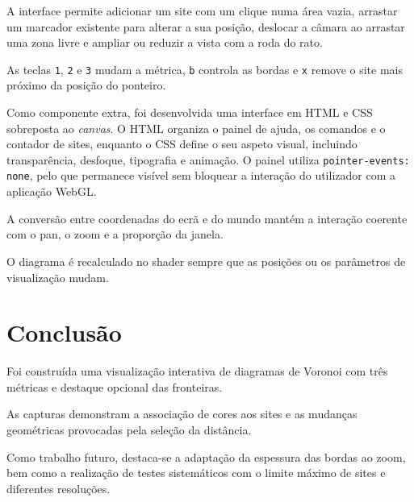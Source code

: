 \documentclass[10pt,a4paper]{article}
\begin{document}
A interface permite adicionar um site com um clique numa área vazia, arrastar um marcador existente para alterar a sua posição, deslocar a câmara ao arrastar uma zona livre e ampliar ou reduzir a vista com a roda do rato.

As teclas \texttt{1}, \texttt{2} e \texttt{3} mudam a métrica, \texttt{b} controla as bordas e \texttt{x} remove o site mais próximo da posição do ponteiro.

Como componente extra, foi desenvolvida uma interface em HTML e CSS sobreposta ao \emph{canvas}. O HTML organiza o painel de ajuda, os comandos e o contador de sites, enquanto o CSS define o seu aspeto visual, incluindo transparência, desfoque, tipografia e animação. O painel utiliza \texttt{pointer-events: none}, pelo que permanece visível sem bloquear a interação do utilizador com a aplicação WebGL.

A conversão entre coordenadas do ecrã e do mundo mantém a interação coerente com o pan, o zoom e a proporção da janela.

O diagrama é recalculado no shader sempre que as posições ou os parâmetros de visualização mudam.

\section{Conclusão}

Foi construída uma visualização interativa de diagramas de Voronoi com três métricas e destaque opcional das fronteiras.

As capturas demonstram a associação de cores aos sites e as mudanças geométricas provocadas pela seleção da distância.

Como trabalho futuro, destaca-se a adaptação da espessura das bordas ao zoom, bem como a realização de testes sistemáticos com o limite máximo de sites e diferentes resoluções.
\end{document}
